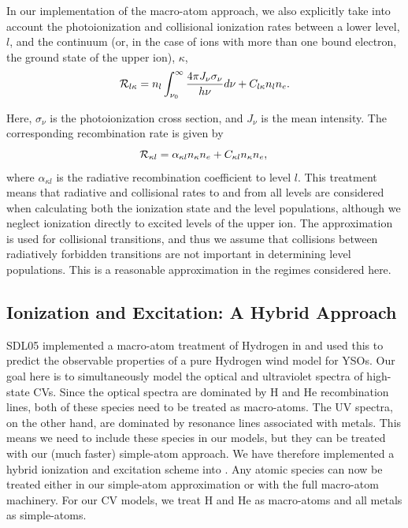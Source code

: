 \documentclass[preprint, a4paper, 11pt]{aastex}
\begin{document}
In our implementation of the macro-atom approach, we also explicitly
take into account the photoionization and collisional ionization rates
between a lower level, $l$, and the continuum (or, in the case of ions
with more than one bound electron, the ground state of the upper ion),
$\kappa$,
\begin{equation}
{\cal R}_{l \kappa}= n_l \int_{\nu_0}^{\infty} \frac{ 4 \pi J_{\nu}
  \sigma_{\nu}}{h \nu} d\nu + C_{l \kappa} n_l n_e.
\end{equation}

Here, $\sigma_{\nu}$ is the photoionization cross section, and $J_{\nu}$
is the mean intensity. The corresponding recombination rate is given
by 
\begin{equation}
{\cal R}_{\kappa l} = \alpha_{\kappa l} n_{\kappa} n_e + C_{\kappa l}
n_\kappa n_e, \\
\end{equation}
where $\alpha_{\kappa l}$ is the radiative recombination coefficient
to level $l$. This treatment means that radiative and collisional
rates to and from all levels are considered when calculating both the
ionization state and the level populations, although we neglect 
ionization directly to excited levels of the upper ion. The
\cite{vanregemorter} approximation is used for collisional
transitions, and thus we assume that collisions between radiatively
forbidden transitions are not important in determining level
populations. This is a reasonable approximation in the regimes
considered here.

\subsection{Ionization and Excitation: A Hybrid Approach}

SDL05 implemented a macro-atom treatment of Hydrogen in \py and used
this to predict the observable properties of a pure Hydrogen wind
model for YSOs. Our goal here is to simultaneously model the optical
and ultraviolet spectra of high-state CVs. Since the optical spectra
are dominated by H and He recombination lines, both of these species
need to be treated as macro-atoms. The UV spectra, on the other hand,
are dominated by resonance lines associated with metals. This means we
need to include these species in our models, but they can be treated 
with our (much faster) simple-atom approach. We have therefore
implemented a hybrid ionization and excitation scheme into \py. Any
atomic species can now be treated either in our simple-atom
approximation or with the full macro-atom machinery. For our CV
models, we treat H and He as macro-atoms and all metals as
simple-atoms.  
\end{document}
